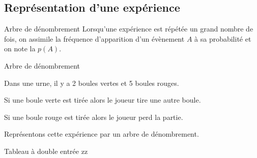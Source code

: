\begin{pageCours}

\section{Représentation d'une expérience}

\begin{DefT}{Arbre de dénombrement}
Lorsqu'une expérience est répétée un grand nombre de fois, on assimile la fréquence d'apparition d'un évènement $A$ à sa probabilité et on note la $p(A)$.

\end{DefT}
 



\begin{ExT}{Arbre de dénombrement}

Dans une urne, il y a 2 boules vertes et 5 boules rouges.
 \begin{description}
\item Si une boule verte est tirée alors le joueur tire une autre boule.
\item Si une boule rouge est tirée alors le joueur perd la partie.
\end{description}

Représentons cette expérience par un arbre de dénombrement.
\end{ExT}
 





\begin{DefT}{Tableau à double entrée}
zz
\end{DefT}





\end{pageCours} 
\begin{pageAD} 




\end{pageAD} 
